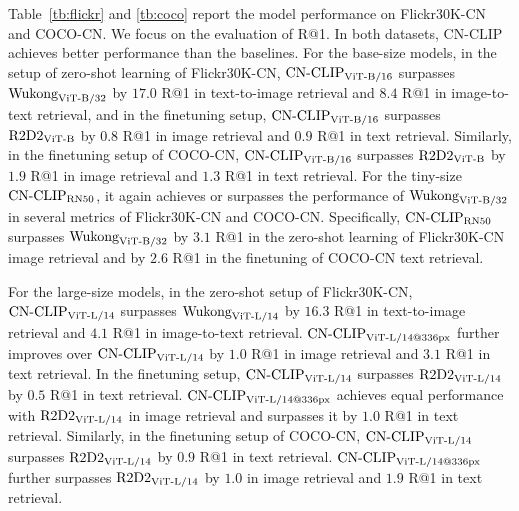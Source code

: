 \documentclass[11pt]{article}
\begin{document}
Table~\ref{tb:flickr} and \ref{tb:coco} report the model performance on Flickr30K-CN and COCO-CN. 
We focus on the evaluation of R@1. 
In both datasets, $\text{CN-CLIP}$ achieves better performance than the baselines. 
For the base-size models, in the setup of zero-shot learning of Flickr30K-CN, $\text{CN-CLIP}\rm_{ViT\text{-}B/16}$ surpasses $\text{Wukong}\rm_{ViT\text{-}B/32}$ by $17.0$ R@1 in text-to-image retrieval and $8.4$ R@1 in image-to-text retrieval, and in the finetuning setup, $\text{CN-CLIP}\rm_{ViT\text{-}B/16}$ surpasses $\text{R2D2}\rm_{ViT\text{-}B}$ by $0.8$ R@1 in image retrieval and $0.9$ R@1 in text retrieval. 
Similarly, in the finetuning setup of COCO-CN, $\text{CN-CLIP}\rm_{ViT\text{-}B/16}$ surpasses $\text{R2D2}\rm_{ViT\text{-}B}$ by $1.9$ R@1 in image retrieval and $1.3$ R@1 in text retrieval. For the tiny-size $\text{CN-CLIP}\rm_{RN50}$, it again achieves or surpasses the performance of $\text{Wukong}\rm_{ViT\text{-}B/32}$ in several metrics of Flickr30K-CN and COCO-CN. Specifically, $\text{CN-CLIP}\rm_{RN50}$ surpasses $\text{Wukong}\rm_{ViT\text{-}B/32}$ by $3.1$ R@1 in the zero-shot learning of Flickr30K-CN image retrieval and by $2.6$ R@1 in the finetuning of COCO-CN text retrieval.

For the large-size models, in the zero-shot setup of Flickr30K-CN, $\text{CN-CLIP}\rm_{ViT\text{-}L/14}$ surpasses $\text{Wukong}\rm_{ViT\text{-}L/14}$ by $16.3$ R@1 in text-to-image retrieval and $4.1$ R@1 in image-to-text retrieval. $\text{CN-CLIP}\rm_{ViT\text{-}L/14@336px}$ further improves over $\text{CN-CLIP}\rm_{ViT\text{-}L/14}$ by $1.0$ R@1 in image retrieval and $3.1$ R@1 in text retrieval. In the finetuning setup, $\text{CN-CLIP}\rm_{ViT\text{-}L/14}$ surpasses $\text{R2D2}\rm_{ViT\text{-}L/14}$ by $0.5$ R@1 in text retrieval. $\text{CN-CLIP}\rm_{ViT\text{-}L/14@336px}$ achieves equal performance with $\text{R2D2}\rm_{ViT\text{-}L/14}$ in image retrieval and surpasses it by $1.0$ R@1 in text retrieval. Similarly, in the finetuning setup of COCO-CN, $\text{CN-CLIP}\rm_{ViT\text{-}L/14}$ surpasses $\text{R2D2}\rm_{ViT\text{-}L/14}$ by $0.9$ R@1 in text retrieval. $\text{CN-CLIP}\rm_{ViT\text{-}L/14@336px}$ further surpasses $\text{R2D2}\rm_{ViT\text{-}L/14}$ by $1.0$ in image retrieval and $1.9$ R@1 in text retrieval. 
\end{document}

